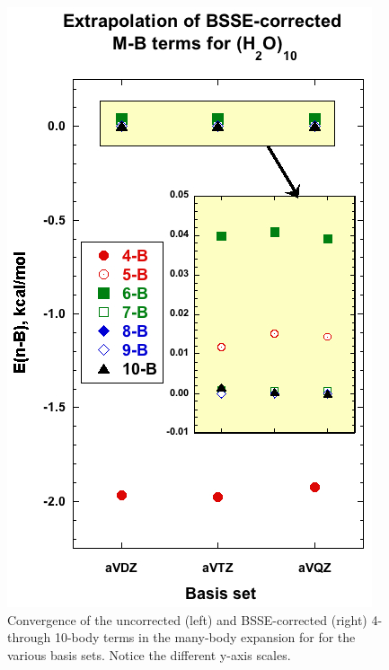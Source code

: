 \documentclass [11pt, proquest] {uwthesis}[2020/02/24]
\begin{document}
\begin{figure}[t]
\begin{center}
\begin{minipage}{0.45\textwidth}
\includegraphics[width=.9\textwidth]{Figures/Chapter_2/MB_extrap_w10_BSSE_all.jpg}
\end{minipage}
\end{center}
\label{fig:MBE_I_F3}
\caption[temp]{Convergence of the uncorrected (left) and BSSE-corrected (right) 4- through 10-body terms in the many-body expansion for  for the various basis sets. Notice the different y-axis scales.}
\end{figure}
\end{document}
